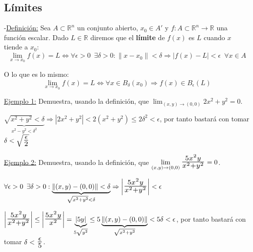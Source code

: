 \documentclass[12pt, titlepage]{article}
\newcommand{\R}{\mathbb{R}}
\newcommand{\bfrac}[2]{\scalebox{1.4}{$\frac{#1}{#2}$}}
\newcommand{\spac}{\, \, \,}
\newcommand{\definicion}{\noindent-\underline{Definición:} }
\begin{document}

\subsection{Límites}
\vspace{5mm}

\definicion Sea $A  \subset \R^n$ un conjunto abierto, $x_0 \in A' \text{ y } f : A \subset \R^n \to \R$ una
función escalar. Dado $L \in \R$ diremos que el \textbf{límite} de $f (x)$ es $L$ cuando $x$ tiende a $x_0$:
\[
\boxed{
\displaystyle \lim_ {x \to x_0}^{} f(x) = L \iff \forall{\epsilon > 0} \spac \exists{\delta > 0} : 
 \|x - x_0\| < \delta \Rightarrow |f (x) - L| < \epsilon \spac \forall{x \in A}
}
\]

O lo que es lo mismo:
\[
\boxed{
\displaystyle \lim_{x \to x_0}^{} f (x) =L \iff \forall{x \in B_\delta (x_0)} \Rightarrow f (x) \in B_\epsilon(L)
}
\]
\vspace{3mm}

\underline{Ejemplo 1:} Demuestra, usando la definición, que $\displaystyle \lim_{(x, y) \to (0, 0)} 2x^2 + 
y^2 = 0$.
\vspace{3mm}

\indent \indent{$\forall{\epsilon > 0} \spac \exists \delta > 0 : \| (x, y) - (0, 0) \| < \delta \Rightarrow 
| (2x^2 + y^2) - 0 | < \epsilon$}

\indent \indent$\underbrace{\sqrt{x^2 + y^2} < \delta}_{x^2 - y^2 < \delta^2} \Rightarrow | 2x^2 + 
y^2 | < 2 (x^2 + y^2) \leq 2\delta^2 < \epsilon$, por tanto bastará \indent \indent con tomar $\delta <
\sqrt{\bfrac{\epsilon}{2}}$
\vspace{3mm}

\underline{Ejemplo 2:} Demuestra, usando la definición, que $\displaystyle \lim_{ (x, y) \to (0, 0) } 
\bfrac{5x^2y}{x^2 + y^2} =0$.
\vspace{3mm}

\indent\indent $\forall{\epsilon > 0} \spac \exists{\delta > 0} : \underbrace{\| (x, y) - (0, 0) \| < \delta}_
{\sqrt{x^2 + y^2} < \delta} \Rightarrow \left | \bfrac{5x^2y}{x^2 + y^2} \right |< \epsilon$

\indent\indent$\left |\bfrac{5x^2 y}{x^2 + y^2} \right | \leq \left | \bfrac{5x^2 y}{x^2} \right | = \underbrace{|5 y|}_{5 \sqrt{y^2}} \leq 5 \underbrace {\|(x, y) - (0, 0)\|}_{\sqrt{x^2 + y^2}} < 5 \delta < 
\epsilon$, por tanto \indent\indent bastará con tomar $\delta < \bfrac{\epsilon}{5}$.
\vspace{5mm}
\end{document}
